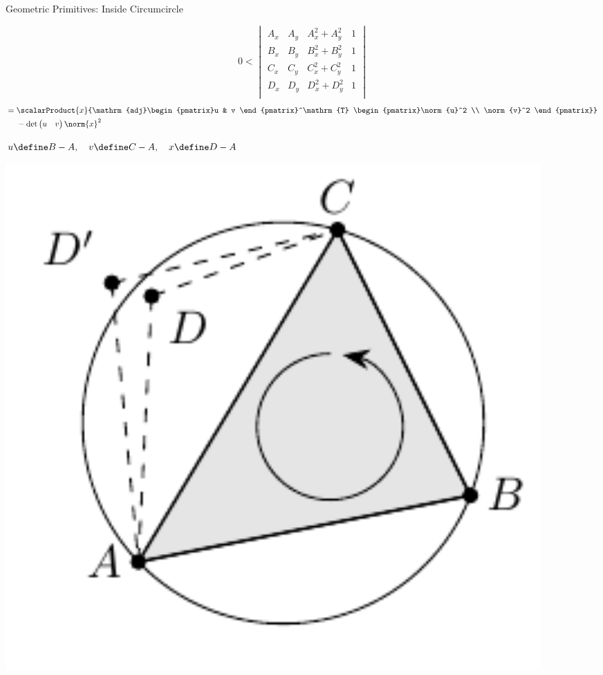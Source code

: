 \documentclass[aspectratio=169,fleqn]{beamer}
\begin{document}
  \begin{frame}{Geometric Primitives: Inside Circumcircle}
    \pause
    \begin{minipage}[c]{0.49\textwidth}
      \begin{mybox}
        \[
          0 <
          \begin{vmatrix}
            A_x & A_y & A_x^2 + A_y^2 & 1 \\
            B_x & B_y & B_x^2 + B_y^2 & 1 \\
            C_x & C_y & C_x^2 + C_y^2 & 1 \\
            D_x & D_y & D_x^2 + D_y^2 & 1 \\
          \end{vmatrix}
        \]
        \pause
        \[
          =
          \begin{aligned}[t]
            &\scalarProduct{x}{\mathrm{adj}\begin{pmatrix}u & v \end{pmatrix}^\mathrm{T} \begin{pmatrix}\norm{u}^2 \\ \norm{v}^2 \end{pmatrix}} \\
            &- \det\begin{pmatrix}u & v \end{pmatrix}\norm{x}^2
          \end{aligned}
        \]
      \end{mybox}
      $u \define B-A ,\quad v \define C-A ,\quad x \define D-A$
    \end{minipage}
    \hfill
    \begin{minipage}[c]{0.49\textwidth}
      \center
      \includegraphics[width=0.9\textwidth]{figures/inside-circumcircle.pdf}
    \end{minipage}
  \end{frame}
\end{document}
